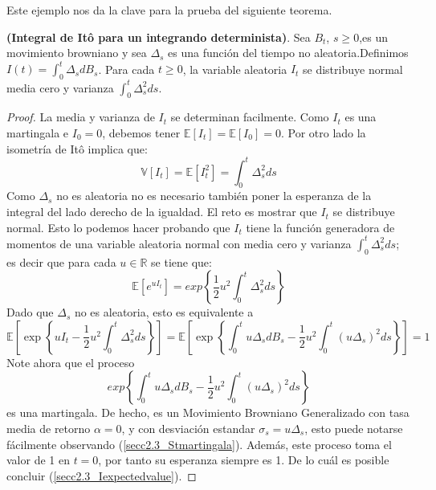 \documentclass[11pt,notitlepage]{article}
\begin{document}
Este ejemplo nos da la clave para la prueba del siguiente teorema.

\begin{teor}\label{secc2.3_IntItodetermin} \textbf{(Integral de Itô para un integrando determinista)}. Sea $B_{t}$, $s\geq0$,es un movimiento browniano y sea $\Delta_{s}$ es una función del tiempo no aleatoria.Definimos $I(t) = \int_{0}^{t}\Delta_{s}dB_{s}$. Para cada $t\geq0$, la variable aleatoria $I_{t}$ se distribuye normal media cero y varianza $\int_{0}^{t}\Delta^{2}_{s}ds$.
\end{teor}

\begin{proof}
La media y varianza de $I_{t}$ se determinan facilmente.  Como $I_{t}$ es
una martingala e $I_{0} = 0$, debemos tener $\mathbb{E}[I_{t}] =\mathbb{E}[I_{0}] = 0$. Por otro lado la isometría de Itô implica que:
\begin{equation*}
    \mathbb{V}[I_{t}]=\mathbb{E}[I_{t}^{2}]=\int_{0}^{t}\Delta^{2}_{s}ds
\end{equation*}
Como $\Delta_{s}$ no es aleatoria no es necesario también poner la esperanza de la integral del lado derecho de la igualdad. El reto es mostrar que $I_{t}$ se distribuye normal. Esto lo podemos hacer probando que $I_{t}$ tiene la función generadora de momentos de una variable aleatoria normal con media cero y varianza $\int_{0}^{t}\Delta^{2}_{s}ds$; es decir que para cada $u \in \mathbb{R}$ se tiene que:
\begin{equation}
    \mathbb{E}[e^{uI_{t}}]=exp\left \{ \frac{1}{2}u^2\int_{0}^{t}\Delta^{2}_{s}ds \right \} 
\end{equation}
Dado que $\Delta_{s}$ no es aleatoria, esto es equivalente a 
\begin{equation}\label{secc2.3_Iexpectedvalue}
    \mathbb{E}\left [ \exp\left \{ uI_{t}-\frac{1}{2}u^2 \int_{0}^{t}\Delta^{2}_{s}ds \right \} \right ]=\mathbb{E}\left [\exp\left \{\int_{0}^{t}u\Delta_{s}dB_{s}-\frac{1}{2}u^2 \int_{0}^{t}\left ( u\Delta_{s}\right )^2ds \right \} \right ]=1
\end{equation}
Note ahora que el proceso
\begin{equation*}
    exp\left \{\int_{0}^{t}u\Delta_{s}dB_{s}-\frac{1}{2}u^2 \int_{0}^{t}\left ( u\Delta_{s}\right )^2ds \right \} 
\end{equation*}
es una martingala. De hecho, es un Movimiento Browniano Generalizado con tasa media de retorno $\alpha=0$, y con desviación estandar $\sigma_{s}=u\Delta_{s}$, esto puede notarse fácilmente observando (\ref{secc2.3_Stmartingala}). Además, este proceso toma el valor de 1 en $t=0$, por tanto su esperanza siempre es 1. De lo cuál es posible concluir (\ref{secc2.3_Iexpectedvalue}).
\end{proof}
\end{document}
